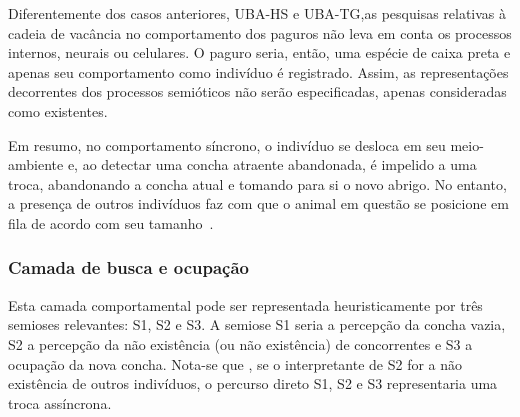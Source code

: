 Diferentemente dos casos anteriores, UBA-HS e UBA-TG,as pesquisas relativas à cadeia de vacância no comportamento dos paguros não leva em conta os processos internos, neurais ou celulares. O paguro seria, então, uma espécie de caixa preta e apenas seu comportamento como indivíduo é registrado. Assim, as representações decorrentes dos processos semióticos não serão especificadas, apenas consideradas como existentes.

Em resumo, no comportamento síncrono, o indivíduo se desloca em seu meio-ambiente e, ao detectar uma concha atraente abandonada, é impelido a uma troca, abandonando a concha atual e tomando para si o novo abrigo. No entanto, a presença de outros indivíduos faz com que o animal em questão se posicione em fila de acordo com seu tamanho~\cite{chase12}.

\subsubsection*{Camada de busca e ocupação}

Esta camada comportamental pode ser representada heuristicamente por três semioses relevantes: S1, S2 e S3. A semiose S1 seria a percepção da concha vazia, S2 a percepção da não existência (ou não existência) de concorrentes e S3 a ocupação da nova concha. Nota-se que , se o interpretante de S2 for a não existência de outros indivíduos, o percurso direto S1, S2 e S3 representaria uma troca assíncrona.

